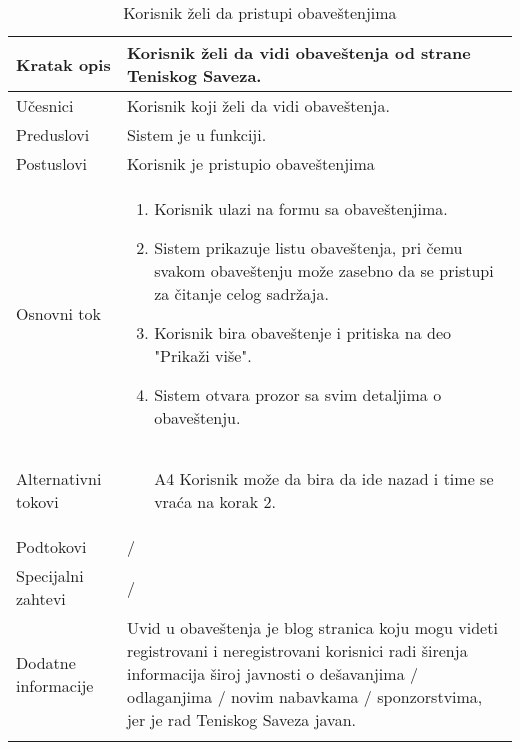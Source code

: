 \documentclass{article}
\begin{document}
        \begin{longtable}{| p{} | p{} |} 
            \hline
                Kratak opis & Korisnik želi da vidi obaveštenja od strane Teniskog Saveza.\\ 
            \hline    
                Učesnici & Korisnik koji želi da vidi obaveštenja. \\
            \hline
               Preduslovi &  Sistem je u funkciji.\\
            \hline  
                Postuslovi &  Korisnik je pristupio obaveštenjima\\
            \hline
                Osnovni tok & \begin{enumerate}
                    \item Korisnik ulazi na formu sa obaveštenjima.
                    \item Sistem prikazuje listu obaveštenja, pri čemu svakom obaveštenju može zasebno da se pristupi za čitanje celog sadržaja.
                    \item Korisnik bira obaveštenje i pritiska na deo "Prikaži više".
                    \item Sistem otvara prozor sa svim detaljima o obaveštenju.
                \end{enumerate}\\
            \hline
                Alternativni tokovi & \begin{itemize}
                    \item[A4] Korisnik može da bira da ide nazad i time se vraća na korak 2.
                \end{itemize}\\
            \hline
                Podtokovi & /\\
            \hline
                Specijalni zahtevi & /\\
            \hline
                Dodatne informacije & Uvid u obaveštenja je blog stranica koju mogu videti registrovani i neregistrovani korisnici radi širenja informacija široj javnosti o dešavanjima / odlaganjima / novim nabavkama / sponzorstvima, jer je rad Teniskog Saveza javan.\\
            \hline
            \caption{Korisnik želi da pristupi obaveštenjima} 
        \end{longtable}
\end{document}
